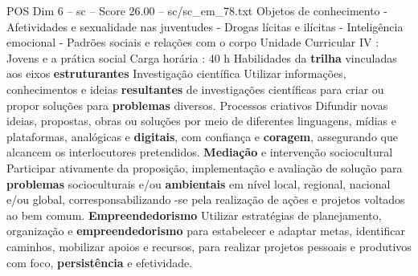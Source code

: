\begin{textsample}{POS Dim 6 – sc – Score 26.00 – sc/sc\_em\_78.txt}
Objetos de conhecimento - Afetividades e sexualidade nas juventudes - Drogas lícitas e ilícitas - Inteligência emocional - Padrões sociais e relações com o corpo Unidade Curricular IV : Jovens e a prática social Carga horária : 40 h Habilidades da \textbf{trilha} vinculadas aos eixos \textbf{estruturantes} Investigação científica Utilizar informações, conhecimentos e ideias \textbf{resultantes} de investigações científicas para criar ou propor soluções para \textbf{problemas} diversos.
Processos criativos Difundir novas ideias, propostas, obras ou soluções por meio de diferentes linguagens, mídias e plataformas, analógicas e \textbf{digitais}, com confiança e \textbf{coragem}, assegurando que alcancem os interlocutores pretendidos. \textbf{Mediação} e intervenção sociocultural Participar ativamente da proposição, implementação e avaliação de solução para \textbf{problemas} socioculturais e/ou \textbf{ambientais} em nível local, regional, nacional e/ou global, corresponsabilizando -se pela realização de ações e projetos voltados ao bem comum. \textbf{Empreendedorismo} Utilizar estratégias de planejamento, organização e \textbf{empreendedorismo} para estabelecer e adaptar metas, identificar caminhos, mobilizar apoios e recursos, para realizar projetos pessoais e produtivos com foco, \textbf{persistência} e efetividade.

\end{textsample}
